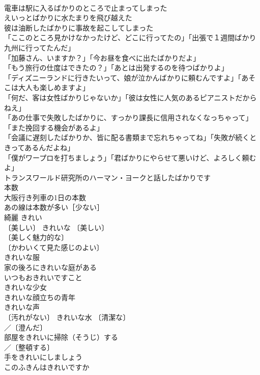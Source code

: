 \documentclass[8pt]{extreport}
\begin{document}
\begin{CJK}{UTF8}{min}
\\	電車は駅に入るばかりのところで止まってしまった 
\\	えいっとばかりに水たまりを飛び越えた 
\\	彼は油断したばかりに事故を起こしてしまった 
\\	「ここのところ見かけなかったけど、どこに行ってたの」「出張で１週間ばかり九州に行ってたんだ」 
\\	「加藤さん、いますか？」「今お昼を食べに出たばかりだよ」 
\\	「もう旅行の仕度はできたの？」「あとは出発するのを待つばかりよ」 
\\	「ディズニーランドに行きたいって、娘が泣かんばかりに頼むんですよ」「あそこは大人も楽しめますよ」 
\\	「何だ、客は女性ばかりじゃないか」「彼は女性に人気のあるピアニストだからねえ」 
\\	「あの仕事で失敗したばかりに、すっかり課長に信用されなくなっちゃって」「また挽回する機会があるよ」 
\\	「会議に遅刻したばかりか、皆に配る書類まで忘れちゃってね」「失敗が続くときってあるんだよね」 
\\	「僕がワープロを打ちましょう」「君ばかりにやらせて悪いけど、よろしく頼むよ」 
\\	トランスワールド研究所のハーマン・ヨークと話したばかりです 
\\	本数		
\\	大阪行き列車の1日の本数 
\\	あの線は本数が多い［少ない］ 
\\	綺麗	きれい	
\\	〔美しい〕 きれいな 〔美しい〕
\\	〔美しく魅力的な〕
\\	〔かわいくて見た感じのよい〕
\\	きれいな服 
\\	家の後ろにきれいな庭がある 
\\	いつもおきれいですこと 
\\	きれいな少女 
\\	きれいな顔立ちの青年 
\\	きれいな声 
\\	〔汚れがない〕 きれいな水 〔清潔な〕
\\	／〔澄んだ〕
\\	部屋をきれいに掃除（そうじ）する 
\\	／〔整頓する〕
\\	手をきれいにしましょう 
\\	このふきんはきれいですか 

\end{CJK}
\end{document}
